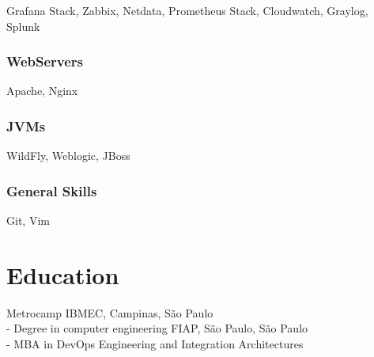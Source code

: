 \documentclass{article}
\begin{document}
Grafana Stack, Zabbix, Netdata, Prometheus Stack, Cloudwatch, Graylog, Splunk

\subsubsection{WebServers}

Apache, Nginx

\subsubsection{JVMs}

WildFly, Weblogic, JBoss

\subsubsection{General Skills}

Git, Vim

\section{Education}

Metrocamp IBMEC, Campinas, São Paulo \\
- Degree in computer engineering \newline
\newline
FIAP, São Paulo, São Paulo \\
- MBA in DevOps Engineering and Integration Architectures
\end{document}
